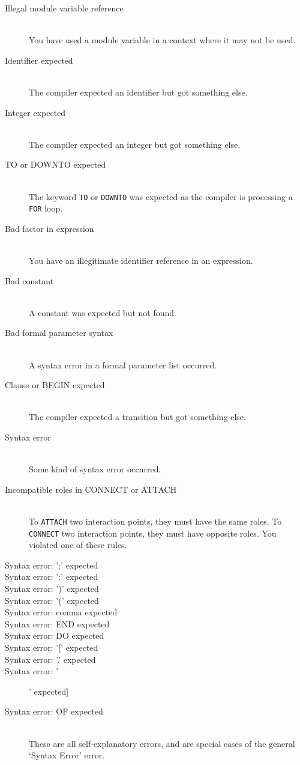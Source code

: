 \begin{description}
\item[Illegal module variable reference]\mbox{}\\
You have used a module variable in a context where it may not be
used.

\item[Identifier expected]\mbox{}\\
The compiler expected an identifier but got something else.

\item[Integer expected]\mbox{}\\
The compiler expected an integer but got something else.

\item[TO or DOWNTO expected]\mbox{}\\
The keyword {\tt TO} or {\tt DOWNTO} was expected as the compiler
is processing a {\tt FOR} loop.

\item[Bad factor in expression]\mbox{}\\
You have an illegitimate identifier reference in an expression.

\item[Bad constant]\mbox{}\\
A constant was expected but not found.

\item[Bad formal parameter syntax]\mbox{}\\
A syntax error in a formal parameter list occurred.

\item[Clause or BEGIN expected]\mbox{}\\
The compiler expected a transition but got something else.

\item[Syntax error]\mbox{}\\
Some kind of syntax error occurred.

\item[Incompatible roles in CONNECT or ATTACH]\mbox{}\\
To {\tt ATTACH} two interaction points, they must have the same
roles. To {\tt CONNECT} two interaction points, they must have
opposite roles. You violated one of these rules.

\item[Syntax error: ';' expected]
\item[Syntax error: ':' expected]
\item[Syntax error: ')' expected]
\item[Syntax error: '(' expected]
\item[Syntax error: comma expected]
\item[Syntax error: END expected]
\item[Syntax error: DO expected]
\item[Syntax error: '[' expected]
\item[Syntax error: '.' expected]
\item[Syntax error: ']' expected]
\item[Syntax error: OF expected]\mbox{}\\
These are all self-explanatory errors, and are special cases of the
general `Syntax Error' error.


\end{description}
